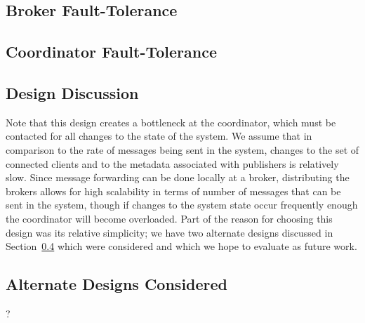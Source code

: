 \subsection{Broker Fault-Tolerance}

\subsection{Coordinator Fault-Tolerance}
\label{subsec:coordinator_fault_tolerance}

\subsection{Design Discussion}


Note that this design creates a bottleneck at the coordinator, which must be contacted for all changes to the state of the system.
We assume that in comparison to the rate of messages being sent in the system, changes to the set of connected clients and to the metadata associated with publishers is relatively slow.
Since message forwarding can be done locally at a broker, distributing the brokers allows for high scalability in terms of number of messages that can be sent in the system, though if changes to the system state occur frequently enough the coordinator will become overloaded.
Part of the reason for choosing this design was its relative simplicity; we have two alternate designs discussed in Section~\ref{subsec:alternate_designs} which were considered and which we hope to evaluate as future work.


\subsection{Alternate Designs Considered}
\label{subsec:alternate_designs}
?
